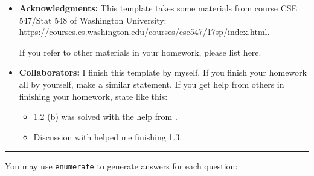 \documentclass[a4paper]{article}
\begin{document}








\begin{itemize}
\item {\bf Acknowledgments: \/} 
  This template takes some materials from course CSE 547/Stat 548 of Washington University: \small{\url{https://courses.cs.washington.edu/courses/cse547/17sp/index.html}}.

  If you refer to other materials in your homework, please list here.
\item {\bf Collaborators: \/}
  I finish this template by myself. If you finish your homework all by yourself, make a similar statement. If you get help from others in finishing your homework, state like this:
  \begin{itemize}
  \item 1.2 (b) was solved with the help from \underline{\hspace{3em}}.
  \item Discussion with \underline{\hspace{3em}} helped me finishing 1.3.
  \end{itemize}
\end{itemize}
\rule{\textwidth}{1pt}

\vspace{2em}

You may use \texttt{enumerate} to generate answers for each question:
\end{document}
